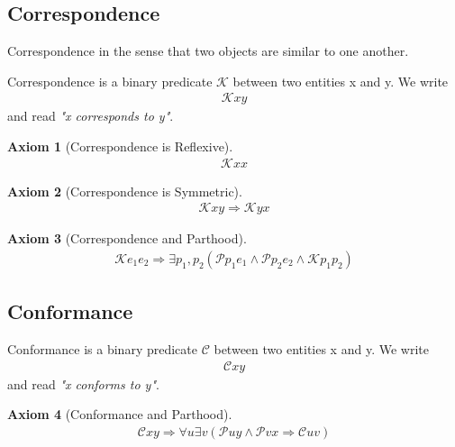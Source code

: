 \documentclass[runningheads,a4paper]{llncs}
\newtheorem{axiom}{Axiom}
\begin{document}
\subsection{Correspondence}


Correspondence in the sense that two objects are similar to one another.


\begin{definition}[Correspondence]
Correspondence is a binary predicate $\mathcal{K}$ between two entities x and y. We write
\begin{align}
\mathcal{K} x y
\end{align}
and read \textit{"x corresponds to y"}.
\end{definition}

\begin{axiom}[Correspondence is Reflexive]
\begin{align}
\mathcal{K} x x
\end{align}
\end{axiom}


\begin{axiom}[Correspondence is Symmetric]
\begin{align}
\mathcal{K} x y \Rightarrow \mathcal{K} y x
\end{align}
\end{axiom}

\begin{axiom}[Correspondence and Parthood]
\begin{align}
\mathcal{K} e_1 e_2 
\Rightarrow \exists p_1,p_2(\mathcal{P} p_1 e_1 \wedge \mathcal{P} p_2 e_2 \wedge \mathcal{K} p_1 p_2)
\end{align}
\end{axiom}

\subsection{Conformance}

\begin{definition}[Conformance]
Conformance is a binary predicate $\mathcal{C}$ between two entities x and y. We write
\begin{align}
\mathcal{C} x y
\end{align}
and read \textit{"x conforms to y"}.
\end{definition}


\begin{axiom}[Conformance and Parthood]
\begin{align}
\mathcal{C} x y \Rightarrow \forall u \exists v (\mathcal{P}uy \wedge \mathcal{P}vx \Rightarrow \mathcal{C} u v) 
\end{align}
\end{axiom}
\end{document}
